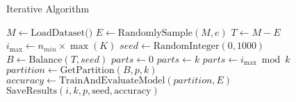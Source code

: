 \documentclass{article}
\begin{document}
\begin{algorithm}
\caption{Iterative Algorithm}\label{iterative_algorithm}
\begin{algorithmic}[1]
    \State $M \gets \text{LoadDataset()}$
    \State $E \gets \text{RandomlySample}(M,e)$
    \State $T \gets M - E$
    \State $i_{\max} \gets n_{min} \times \max(K)$
        \State $seed \gets \text{RandomInteger}(0, 1000)$
        \State $B \gets \text{Balance}(T, seed)$
            \State $parts \gets 0$
                \State $parts \gets k$
                \State $parts \gets i_{\max} \bmod k$
            \EndIf
                \State $partition \gets \text{GetPartition}(B, p, k)$
                \State $accuracy \gets \text{TrainAndEvaluateModel}(partition, E)$
                \State $\text{SaveResults}(i, k, p, \text{seed}, \text{accuracy})$
            \EndFor
        \EndFor
    \EndFor
\EndProcedure
\end{algorithmic}
\end{algorithm}
\end{document}
